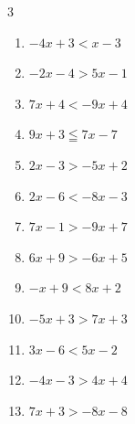 \begin{multicols}{3}
\begin{enumerate}

  \item $-4x+3<x-3$


  \item $-2x-4>5x-1$


  \item $7x+4<-9x+4$

        \phantom{$\displaystyle x<0$}

\columnbreak %

\resetques

  \item $9x+3\leqq 7x-7$

        \phantom{$\displaystyle x\leqq -5$}

  \item $2x-3>-5x+2$


  \item $2x-6<-8x-3$


  \item $7x-1>-9x+7$


  \item $6x+9>-6x+5$


  \item $-x+9<8x+2$


  \item $-5x+3>7x+3$

        \phantom{$\displaystyle x<0$}

  \item $3x-6<5x-2$

        \phantom{$\displaystyle x>-2$}

  \item $-4x-3>4x+4$


  \item $7x+3>-8x-8$



\end{enumerate}
\end{multicols}
